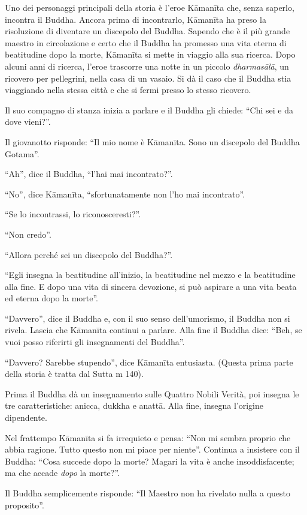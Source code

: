 Uno dei personaggi principali della storia è l'eroe Kāmanīta che, senza saperlo, incontra il Buddha. Ancora prima di incontrarlo, Kāmanīta ha preso la risoluzione di diventare un discepolo del Buddha. Sapendo che è il più grande maestro in circolazione e certo che il Buddha ha promesso una vita eterna di beatitudine dopo la morte, Kāmanīta si mette in viaggio alla sua ricerca. Dopo alcuni anni di ricerca, l'eroe trascorre una notte in un piccolo \textit{dharmasālā}, un ricovero per pellegrini, nella casa di un vasaio. Si dà il caso che il Buddha stia viaggiando nella stessa città e che si fermi presso lo stesso ricovero. 

Il suo compagno di stanza inizia a parlare e il Buddha gli chiede: ``Chi sei e da dove vieni?''.

Il giovanotto risponde: ``Il mio nome è Kāmanīta. Sono un discepolo del Buddha Gotama''.

``Ah'', dice il Buddha, ``l'hai mai incontrato?''.

``No'', dice Kāmanīta, ``sfortunatamente non l'ho mai incontrato''.

``Se lo incontrassi, lo riconosceresti?''.

``Non credo''.

``Allora perché sei un discepolo del Buddha?''.

``Egli insegna la beatitudine all'inizio, la beatitudine nel mezzo e la beatitudine alla fine. E dopo una vita di sincera devozione, si può aspirare a una vita beata ed eterna dopo la morte''.

``Davvero'', dice il Buddha e, con il suo senso dell'umorismo, il Buddha non si rivela. Lascia che Kāmanīta continui a parlare. Alla fine il Buddha dice: ``Beh, se vuoi posso riferirti gli insegnamenti del Buddha''.

``Davvero? Sarebbe stupendo'', dice Kāmanīta entusiasta. (Questa prima parte della storia è tratta dal Sutta m 140).

Prima il Buddha dà un insegnamento sulle Quattro Nobili Verità, poi insegna le tre caratteristiche: anicca, dukkha e anattā. Alla fine, insegna l'origine dipendente. 

Nel frattempo Kāmanīta si fa irrequieto e pensa: ``Non mi sembra proprio che abbia ragione. Tutto questo non mi piace per niente''. Continua a insistere con il Buddha: ``Cosa succede dopo la morte? Magari la vita è anche insoddisfacente; ma che accade \textit{dopo} la morte?''. 

Il Buddha semplicemente risponde: ``Il Maestro non ha rivelato nulla a questo proposito''. 

